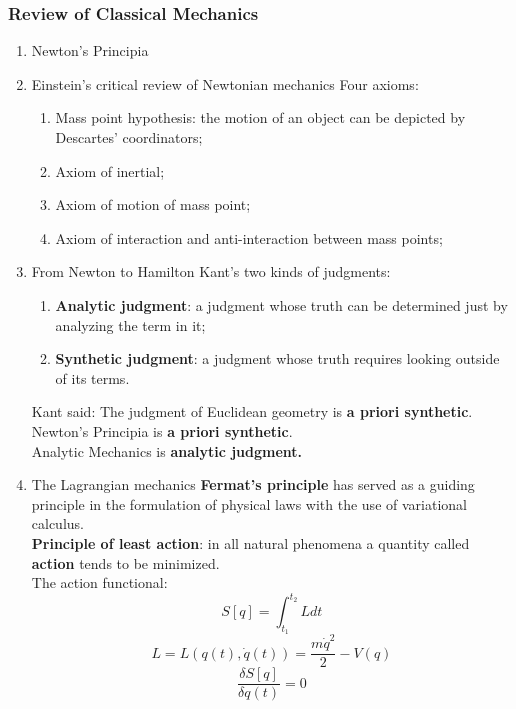 \documentclass[12pt]{article}
\numberwithin{equation}{section}
\begin{document}
\subsubsection{Review of Classical Mechanics}
\begin{enumerate}
\item Newton's Principia
\item Einstein's critical review of Newtonian mechanics
	Four axioms:
	\begin{enumerate}
	\item Mass point hypothesis: the motion of an object can be depicted by Descartes' coordinators;
	\item Axiom of inertial;
	\item Axiom of motion of mass point;
	\item Axiom of interaction and anti-interaction between mass points;
	\end{enumerate}
\item From Newton to Hamilton
	Kant's two kinds of judgments:
	\begin{enumerate}
	\item \textbf{Analytic judgment}: a judgment whose truth can be determined just by analyzing the term in it;
	\item \textbf{Synthetic judgment}: a judgment whose truth requires looking outside of its terms.
	\end{enumerate}
	Kant said: The judgment of Euclidean geometry is \textbf{a priori synthetic}.\\
	Newton's Principia is \textbf{a priori synthetic}.\\
	Analytic Mechanics is \textbf{analytic judgment.}
\item The Lagrangian mechanics
	\textbf{Fermat's principle} has served as a guiding principle in the formulation of physical laws with the use of variational calculus. \\
	\textbf{Principle of least action}: in all natural phenomena a quantity called \textbf{action} tends to be minimized. \\
	The action functional: 
	\begin{equation}S[q]=\int_{t_1}^{t_2}Ldt\end{equation}
	\begin{equation}L=L(q(t),\dot{q}(t))=\frac{m\dot{q}^2}{2}-V(q)\end{equation}
	\begin{equation}\frac{\delta S[q]}{\delta q(t)}=0\end{equation}
	\begin{equation}\begin{aligned}

\end{aligned}
\end{equation}
\end{enumerate}
\end{document}
